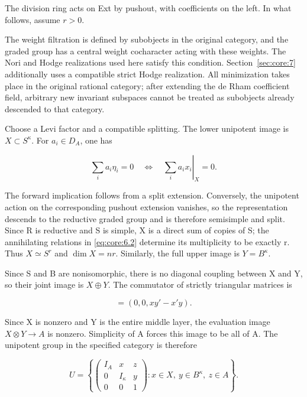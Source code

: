 \documentclass[11pt,a4paper,oneside]{article}
\theoremstyle{plain}
\theoremstyle{definition}
\theoremstyle{remark}
\numberwithin{equation}{section}
\begin{document}
The division ring acts on Ext by pushout, with coefficients on the left. In what follows, assume \(r>0\).

The weight filtration is defined by subobjects in the original category, and the graded group has a central weight cocharacter acting with these weights. The Nori and Hodge realizations used here satisfy this condition. Section~\ref{sec:core:7} additionally uses a compatible strict Hodge realization. All minimization takes place in the original rational category; after extending the de Rham coefficient field, arbitrary new invariant subspaces cannot be treated as subobjects already descended to that category.

Choose a Levi factor and a compatible splitting. The lower unipotent image is \(X\subset S^\kappa\). For \(a_i\in D_A\), one has

\begin{equation}
\sum_i a_i\eta_i=0
        \quad\Longleftrightarrow\quad
       \left.\sum_i a_ix_i\right|_X=0.                   \label{eq:core:6.2}
\end{equation}

The forward implication follows from a split extension. Conversely, the unipotent action on the corresponding pushout extension vanishes, so the representation descends to the reductive graded group and is therefore semisimple and split. Since R is reductive and S is simple, X is a direct sum of copies of S; the annihilating relations in \eqref{eq:core:6.2} determine its multiplicity to be exactly r. Thus \(X\simeq S^r\) and \(\dim X=nr\). Similarly, the full upper image is \(Y=B^\kappa\).

Since S and B are nonisomorphic, there is no diagonal coupling between X and Y, so their joint image is \(X\oplus Y\). The commutator of strictly triangular matrices is

\begin{equation}
[(x,y,z),(x',y',z')]=(0,0,xy'-x'y).                     \label{eq:core:6.3}
\end{equation}

Since X is nonzero and Y is the entire middle layer, the evaluation image \(X\otimes Y\to A\) is nonzero. Simplicity of A forces this image to be all of A. The unipotent group in the specified category is therefore

\begin{equation}
U=\left\{\begin{pmatrix}I_A&x&z\\0&I_\kappa&y\\0&0&1\end{pmatrix}
           :x\in X,\ y\in B^\kappa,\ z\in A\right\}.    \label{eq:core:6.4}
\end{equation}
\end{document}
